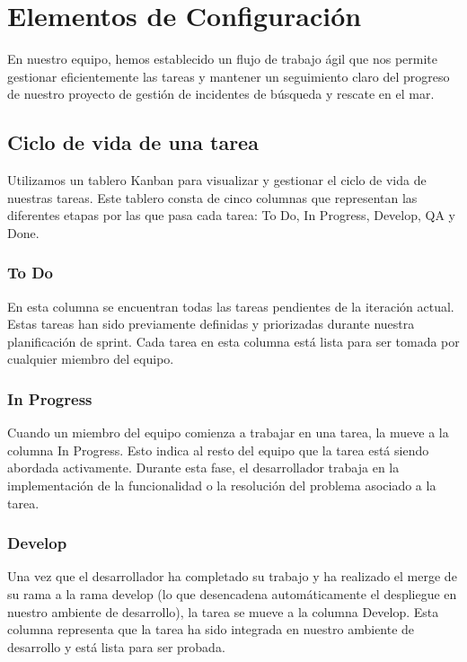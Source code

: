 \section{Elementos de Configuración}\label{sec:elementosDeConfiguracion}

En nuestro equipo, hemos establecido un flujo de trabajo ágil que nos permite gestionar eficientemente las tareas y mantener 
un seguimiento claro del progreso de nuestro proyecto de gestión de incidentes de búsqueda y rescate en el mar.

\subsection{Ciclo de vida de una tarea}
Utilizamos un tablero Kanban para visualizar y gestionar el ciclo de vida de nuestras tareas. Este tablero consta de cinco 
columnas que representan las diferentes etapas por las que pasa cada tarea: To Do, In Progress, Develop, QA y Done.

\subsubsection{To Do}
En esta columna se encuentran todas las tareas pendientes de la iteración actual. Estas tareas han sido previamente definidas 
y priorizadas durante nuestra planificación de sprint. Cada tarea en esta columna está lista para ser tomada por cualquier miembro del equipo.

\subsubsection{In Progress}
Cuando un miembro del equipo comienza a trabajar en una tarea, la mueve a la columna In Progress. Esto indica al resto del equipo que la tarea 
está siendo abordada activamente. Durante esta fase, el desarrollador trabaja en la implementación de la funcionalidad o la resolución del 
problema asociado a la tarea.

\subsubsection{Develop}
Una vez que el desarrollador ha completado su trabajo y ha realizado el merge de su rama a la rama develop (lo que desencadena automáticamente 
el despliegue en nuestro ambiente de desarrollo), la tarea se mueve a la columna Develop. Esta columna representa que la tarea ha sido integrada 
en nuestro ambiente de desarrollo y está lista para ser probada.

